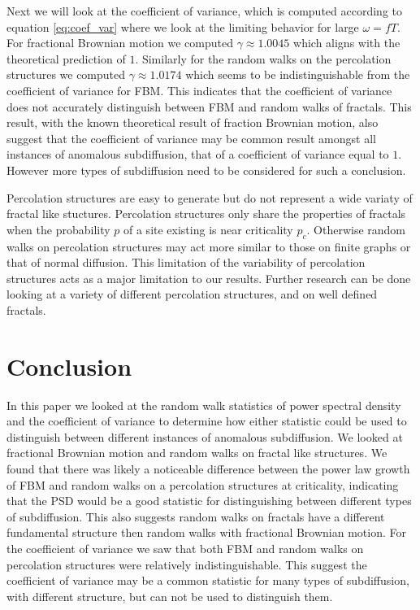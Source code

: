 \documentclass[%
 reprint,
 amsmath,amssymb,
 aps,
]{revtex4-2}
\begin{document}
Next we will look at the coefficient of variance, which is computed according to equation \ref{eq:coef_var} where we look at the limiting behavior for large $\omega=fT$. For fractional Brownian motion we computed $\gamma\approx 1.0045$ which aligns with the theoretical prediction of $1$. Similarly for the random walks on the percolation structures we computed $\gamma\approx 1.0174$ which seems to be indistinguishable from the coefficient of variance for FBM. This indicates that the coefficient of variance does not accurately distinguish between FBM and random walks of fractals. This result, with the known theoretical result of fraction Brownian motion, also suggest that the coefficient of variance may be common result amongst all instances of anomalous subdiffusion, that of a coefficient of variance equal to $1$. However more types of subdiffusion need to be considered for such a conclusion.

Percolation structures are easy to generate but do not represent a wide variaty of fractal like stuctures. Percolation structures only share the properties of fractals when the probability $p$ of a site existing is near criticality $p_c$. Otherwise random walks on percolation structures may act more similar to those on finite graphs or that of normal diffusion. This limitation of the variability of percolation structures acts as a major limitation to our results. Further research can be done looking at a variety of different percolation structures, and on well defined fractals.

\section{Conclusion}
In this paper we looked at the random walk statistics of power spectral density and the coefficient of variance to determine how either statistic could be used to distinguish between different instances of anomalous subdiffusion. We looked at fractional Brownian motion and random walks on fractal like structures. We found that there was likely a noticeable difference between the power law growth of FBM and random walks on a percolation structures at criticality, indicating that the PSD would be a good statistic for distinguishing between different types of subdiffusion. This also suggests random walks on fractals have a different fundamental structure then random walks with fractional Brownian motion. For the coefficient of variance we saw that both FBM and random walks on percolation structures were relatively indistinguishable. This suggest the coefficient of variance may be a common statistic for many types of subdiffusion, with different structure, but can not be used to distinguish them.
\end{document}
